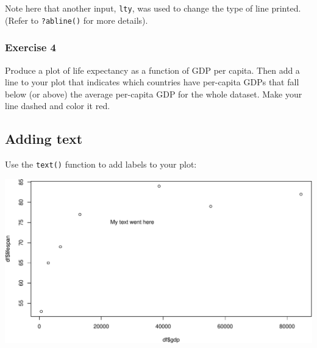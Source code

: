 \documentclass[
]{book}
\newenvironment{Shaded}{\begin{snugshade}}{\end{snugshade}}
\newcommand{\AttributeTok}[1]{\textcolor[rgb]{0.77,0.63,0.00}{#1}}
\newcommand{\DecValTok}[1]{\textcolor[rgb]{0.00,0.00,0.81}{#1}}
\newcommand{\FunctionTok}[1]{\textcolor[rgb]{0.00,0.00,0.00}{#1}}
\newcommand{\NormalTok}[1]{#1}
\newcommand{\SpecialCharTok}[1]{\textcolor[rgb]{0.00,0.00,0.00}{#1}}
\newcommand{\StringTok}[1]{\textcolor[rgb]{0.31,0.60,0.02}{#1}}
\begin{document}
Note here that another input, \texttt{lty}, was used to change the type of line printed. (Refer to \texttt{?abline()} for more details).

\hypertarget{exercise-4-1}{%
\subsubsection*{Exercise 4}\label{exercise-4-1}}

Produce a plot of life expectancy as a function of GDP per capita. Then add a line to your plot that indicates which countries have per-capita GDPs that fall below (or above) the average per-capita GDP for the whole dataset. Make your line dashed and color it red.

\hypertarget{adding-text}{%
\subsection*{Adding text}\label{adding-text}}

Use the \texttt{text()} function to add labels to your plot:

\begin{Shaded}
\end{Shaded}

\includegraphics{figures/unnamed-chunk-119-1.pdf}
\end{document}
